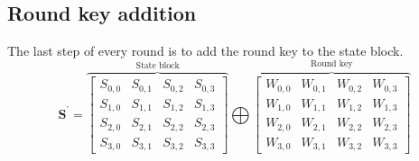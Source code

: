 \documentclass[report.tex]{subfiles}
\begin{document}
\subsection{Round key addition}
The last step of every round is to add the round key to the state block.
\begin{equation}\label{eq:round key}
	\mathbf{S^\text{'}} = 
	\overbrace{
	\begin{bmatrix}
	S_{0,0} & S_{0,1} & S_{0,2} & S_{0,3} \\
	S_{1,0} & S_{1,1} & S_{1,2} & S_{1,3} \\
	S_{2,0} & S_{2,1} & S_{2,2} & S_{2,3} \\
	S_{3,0} & S_{3,1} & S_{3,2} & S_{3,3}
	\end{bmatrix}}^\text{State block}
	\bigoplus
	\overbrace{
	\begin{bmatrix}
	W_{0,0} & W_{0,1} & W_{0,2} & W_{0,3} \\
	W_{1,0} & W_{1,1} & W_{1,2} & W_{1,3} \\
	W_{2,0} & W_{2,1} & W_{2,2} & W_{2,3} \\
	W_{3,0} & W_{3,1} & W_{3,2} & W_{3,3}
	\end{bmatrix}}^\text{Round key}
\end{equation}
\end{document}
